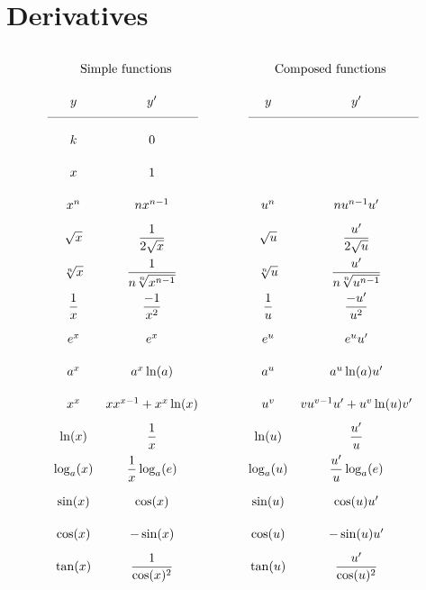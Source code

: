 \section*{Derivatives}
\small
{}

\centering
\begin{tcolorbox}[hbox, title=Basic derivatives]
\begin{minipage}{0.7\textwidth}
\[
  \def\arraystretch{2.15}
  \begin{array}{ccccc}
  \multicolumn{2}{c}{\mbox{Simple functions}} & &  \multicolumn{2}{c}{\mbox{Composed functions}}\\
  y            & y'                            & \qquad & y            & y'\\
  \cmidrule(r){1-2}\cmidrule(l){4-5}
  k            & 0\\
  x            & 1\\ 
  x^n          & nx^{n-1}                      & \qquad & u^n          & nu^{n-1}u'\\
  \sqrt{x}     & \dfrac{1}{2\sqrt{x}}          & \qquad & \sqrt{u}     & \dfrac{u'}{2\sqrt{u}}\\
  \sqrt[n]{x}  & \dfrac{1}{n\sqrt[n]{x^{n-1}}} & \qquad & \sqrt[n]{u}  & \dfrac{u'}{n\sqrt[n]{u^{n-1}}}\\
  \dfrac{1}{x} & \dfrac{-1}{x^2}               & \qquad & \dfrac{1}{u} & \dfrac{-u'}{u^2}\\  
  e^x          & e^x                           & \qquad & e^u          & e^u u'\\
  a^x          & a^x\ln(a)                     & \qquad & a^u          & a^u\ln(a)u'\\
  x^x          & xx^{x-1}+x^x\ln(x)            & \qquad & u^v          & vu^{v-1}u'+u^v\ln(u) v'\\
  \ln(x)       & \dfrac{1}{x}                  & \qquad & \ln(u)        & \dfrac{u'}{u}\\
  \log_a(x)    & \dfrac{1}{x}\log_a(e)         & \qquad & \log_a(u)    & \dfrac{u'}{u}\log_a(e)\\
  \sin(x)      & \cos(x)                       & \qquad & \sin(u)       & \cos(u)u'\\
  \cos(x)      & -\sin(x)                      & \qquad & \cos(u)      & -\sin(u)u'\\
  \tan(x)      & \dfrac{1}{\cos(x)^2}          & \qquad & \tan(u)      & \dfrac{u'}{\cos(u)^2}\\

\end{array}\]
\end{minipage}
\end{tcolorbox}
